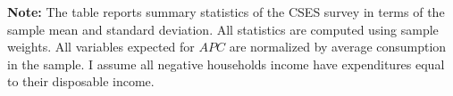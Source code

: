 \documentclass[11pt,letterpaper]{article}
\begin{document}
\begin{table}[H]
{\begin{tabular}{@{}lrrrrrr@{}}
		\hline \hline
	\end{tabular}%
}
\begin{tablenotes}
	\footnotesize
	\item \textbf{Note:} The table reports summary statistics of the CSES survey in terms of the sample mean and standard deviation. All statistics are computed using sample weights. All variables expected for $APC$ are normalized by average consumption in the sample. I assume all negative households income have expenditures equal to their disposable income.   
\end{tablenotes} 
\end{table}

\end{document}
